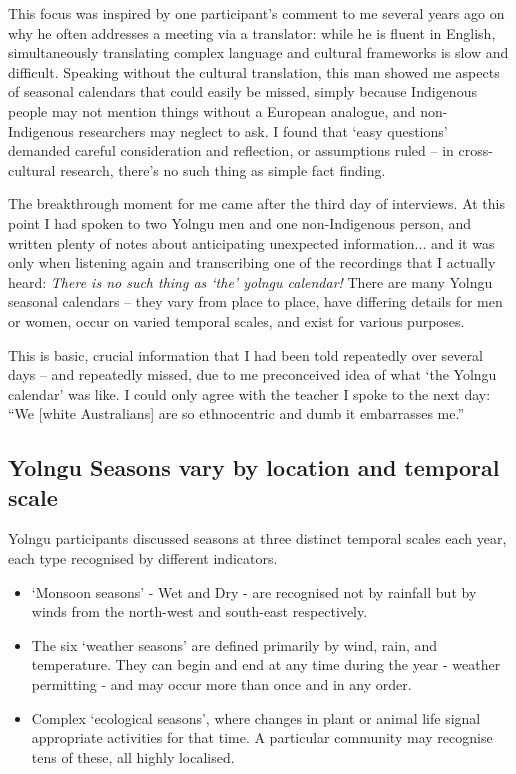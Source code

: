 This focus was inspired by one participant's
comment to me several years ago on why he often addresses a meeting via a
translator: while he is fluent in English, simultaneously translating complex
language and cultural frameworks is slow and difficult.
%
Speaking without the cultural translation, this man showed me aspects of
seasonal calendars that could easily be missed, simply because Indigenous
people may not mention things without a European analogue, and non-Indigenous
researchers may neglect to ask.  I found that `easy questions' demanded careful
consideration and reflection, or assumptions ruled -- in  cross-cultural
research, there's no such thing as simple fact finding.

The breakthrough moment for me came after the third day of interviews.
At this point I had spoken to two Yolngu men and one non-Indigenous
person, and written plenty of notes about anticipating unexpected
information... and it was only when listening again and transcribing
one of the recordings that I actually heard:  \emph{There is no such
thing as `the' yolngu calendar!}  There are many Yolngu seasonal
calendars -- they vary from place to place, have differing details for
men or women, occur on varied temporal scales, and exist for various
purposes.

This is basic, crucial information that I had been told repeatedly over
several days -- and repeatedly missed, due to me preconceived idea of what
`the Yolngu calendar' was like.  I could only agree with the teacher I
spoke to the next day:  ``We [white Australians] are so ethnocentric and
dumb it embarrasses me.''



\subsection{Yolngu Seasons vary by location and temporal scale}
\label{subsec:three-seasons-scales}

Yolngu participants discussed seasons at three distinct temporal scales
each year, each type recognised by different indicators.
\begin{itemize}
\item `Monsoon seasons' - Wet and Dry - are recognised not by rainfall but
        by winds from the north-west and south-east respectively.
\item The six `weather seasons' are defined primarily by wind, rain, and temperature.
        They can begin and end at any time during the year - weather permitting -
        and may occur more than once and in any order.
\item Complex `ecological seasons', where changes in plant or animal life
        signal appropriate activities for that time.  A particular community
        may recognise tens of these, all highly localised.
\end{itemize}

